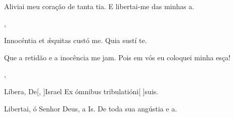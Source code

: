 {{\item {}Aliviai meu coração de tanta tia. {\ResponsoriumC} E libertai-me das minhas a.~\Responsorium},
{\item {}Innocéntia et ǽquitas custó me. {\ResponsoriumC} Quia sustí te.~\Responsorium}%
{\item {}Que a retidão e a inocência me jam. {\ResponsoriumC} Pois em vós eu coloquei minha esça!~\Responsorium},
{\item {}Líbera, De[, ]{Is}rael {\ResponsoriumC} Ex ómnibus tribulatióni[ ]{su}is.~\Responsorium}%
{\item {}Libertai, ó Senhor Deus, a Is. {\ResponsoriumC} De toda sua angústia e a.~\Responsorium}
}